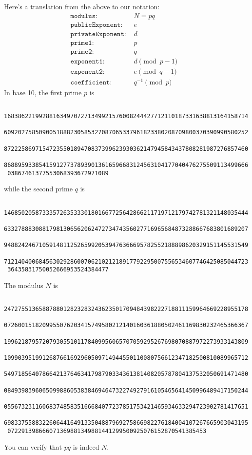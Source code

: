 \begin{ex}
{}
Here's a translation from the above to our notation:
{\small
\begin{align*}
\texttt{modulus: } & N = pq               \\     
\texttt{publicExponent: } & e             \\
\texttt{privateExponent: } & d            \\
\texttt{prime1: } & p                     \\
\texttt{prime2: } & q                     \\
\texttt{exponent1: } & d \pmod{p - 1} &   \\
\texttt{exponent2: } & e \pmod{q - 1} &   \\
\texttt{coefficient: } & q^{-1} \pmod{p}  
\end{align*}
}
In base 10, the first prime $p$ is
{\scriptsize
\begin{Verbatim}
 1683862219928816349707271349921576008244427712110187331638813164158714
 6092027585090051888230585327087065337961823380208709800370390990580252
 8722258697154723550189470837399623930362147945843437808281987276857460
 8688959338541591277378939013616596683124563104177040476275509113499666
 03867461377553068393672971089
\end{Verbatim}
}
while the second prime $q$ is
{\scriptsize
\begin{Verbatim}
 1468502058733357263533301801667725642866211719712179742781321148035444
 6332788830881798130656206247273474356027716965684873288667683801689207
 9488242467105914811252659920539476366695782552188898620329151145531549
 7121404006845630292860070621021218917792295007556534607746425085044723
 36435831750052666953524384477
\end{Verbatim}
}
The modulus $N$ is
{\scriptsize
\begin{Verbatim}
 2472755136588788012823283243623501709484398222718811159964669228955178
 0726001518209955076203415749580212140160361880502461169830232465366367
 1996218795720793055101178409956065707059295267698070887972273933143809
 1099039519912687661692960509714944550110080756612347182500810089965712
 5497185640786642137646341798790334361381408205787804137532050691471480
 0849398396065099886053838469464732274927916105465641450996489417150244
 0556732311606837485835166684077237851753421465934633294723902781417651
 6983375588322606441649133504887969275866982276184004107267665903043195
 072291398666071369881349881441299500925076152870541385453
\end{Verbatim}
}
You can verify that $pq$ is indeed $N$.
\end{ex}

